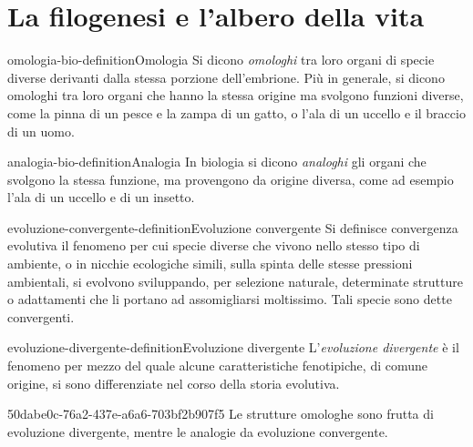 \documentclass[preview]{standalone}
\begin{document}
\genpage

\section{La filogenesi e l'albero della vita}


\begin{snippetdefinition}{omologia-bio-definition}{Omologia}
    Si dicono \textit{omologhi} tra loro organi di specie diverse derivanti dalla stessa porzione dell'embrione.
    Più in generale, si dicono omologhi tra loro organi che hanno la stessa origine ma svolgono funzioni diverse, come la pinna di un pesce e la zampa di un gatto, o l'ala di un uccello e il braccio di un uomo.
\end{snippetdefinition}

\begin{snippetdefinition}{analogia-bio-definition}{Analogia}
    In biologia si dicono \textit{analoghi} gli organi che svolgono la stessa funzione, ma provengono da origine diversa, come ad esempio l'ala di un uccello e di un insetto.
\end{snippetdefinition}

\begin{snippetdefinition}{evoluzione-convergente-definition}{Evoluzione convergente}
    Si definisce convergenza evolutiva il fenomeno per cui specie diverse che vivono nello stesso tipo di ambiente, o in nicchie ecologiche simili, sulla spinta delle stesse pressioni ambientali, si evolvono sviluppando, per selezione naturale, determinate strutture o adattamenti che li portano ad assomigliarsi moltissimo. Tali specie sono dette convergenti. 
\end{snippetdefinition}

\begin{snippetdefinition}{evoluzione-divergente-definition}{Evoluzione divergente}
    L'\textit{evoluzione divergente} è il fenomeno per mezzo del quale alcune caratteristiche fenotipiche, di comune origine, si sono differenziate nel corso della storia evolutiva. 
\end{snippetdefinition}

\begin{snippet}{50dabe0c-76a2-437e-a6a6-703bf2b907f5}
    Le strutture omologhe sono frutta di evoluzione divergente, mentre le analogie da
    evoluzione convergente.
\end{snippet}
\end{document}
